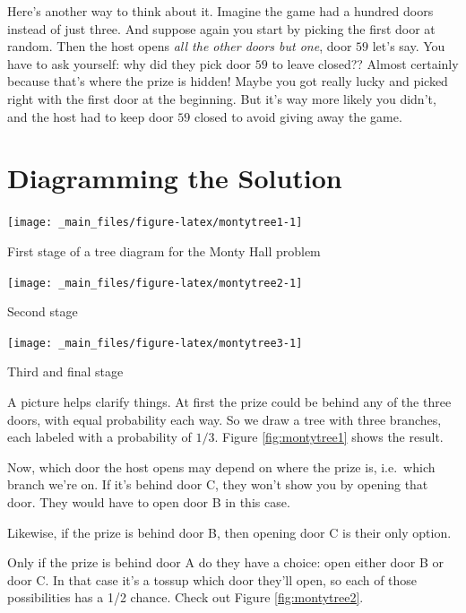 \documentclass[justified]{tufte-book}
\begin{document}
Here's another way to think about it. Imagine the game had a hundred doors instead of just three. And suppose again you start by picking the first door at random. Then the host opens \emph{all the other doors but one}, door \(59\) let's say. You have to ask yourself: why did they pick door \(59\) to leave closed?? Almost certainly because that's where the prize is hidden! Maybe you got really lucky and picked right with the first door at the beginning. But it's way more likely you didn't, and the host had to keep door \(59\) closed to avoid giving away the game.

\hypertarget{diagramming-the-solution}{%
\section{Diagramming the Solution}\label{diagramming-the-solution}}

\begin{marginfigure}
\texttt{[image: \_main\_files/figure-latex/montytree1-1]} \caption[First stage of a tree diagram for the Monty Hall problem]{First stage of a tree diagram for the Monty Hall problem}\label{fig:montytree1}
\end{marginfigure}
\begin{marginfigure}
\texttt{[image: \_main\_files/figure-latex/montytree2-1]} \caption[Second stage]{Second stage}\label{fig:montytree2}
\end{marginfigure}
\begin{marginfigure}
\texttt{[image: \_main\_files/figure-latex/montytree3-1]} \caption[Third and final stage]{Third and final stage}\label{fig:montytree3}
\end{marginfigure}

A picture helps clarify things. At first the prize could be behind any of the three doors, with equal probability each way. So we draw a tree with three branches, each labeled with a probability of \(1/3\). Figure \ref{fig:montytree1} shows the result.

Now, which door the host opens may depend on where the prize is, i.e.~which branch we're on. If it's behind door C, they won't show you by opening that door. They would have to open door B in this case.

Likewise, if the prize is behind door B, then opening door C is their only option.

Only if the prize is behind door A do they have a choice: open either door B or door C. In that case it's a tossup which door they'll open, so each of those possibilities has a 1/2 chance. Check out Figure \ref{fig:montytree2}.
\end{document}

